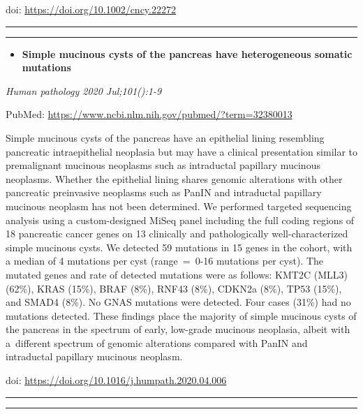 \documentclass[
]{article}
\providecommand{\tightlist}{%
  \setlength{\itemsep}{0pt}\setlength{\parskip}{0pt}}
\begin{document}
doi: \url{https://doi.org/10.1002/cncy.22272}

\begin{center}\rule{0.5\linewidth}{0.5pt}\end{center}

\begin{center}\rule{0.5\linewidth}{0.5pt}\end{center}

\begin{itemize}
\tightlist
\item
  \textbf{Simple mucinous cysts of the pancreas have heterogeneous
  somatic mutations}
\end{itemize}

\emph{Human pathology 2020 Jul;101():1-9}

PubMed: \url{https://www.ncbi.nlm.nih.gov/pubmed/?term=32380013}

Simple mucinous cysts of the pancreas have an epithelial lining
resembling pancreatic intraepithelial neoplasia but may have a clinical
presentation similar to premalignant mucinous neoplasms such as
intraductal papillary mucinous neoplasms. Whether the epithelial lining
shares genomic alterations with other pancreatic preinvasive neoplasms
such as PanIN and intraductal papillary mucinous neoplasm has not been
determined. We performed targeted sequencing analysis using a
custom-designed MiSeq panel including the full coding regions of 18
pancreatic cancer genes on 13 clinically and pathologically
well-characterized simple mucinous cysts. We detected 59 mutations in 15
genes in the cohort, with a median of 4 mutations per cyst (range~=~0-16
mutations per cyst). The mutated genes and rate of detected mutations
were as follows: KMT2C (MLL3) (62\%), KRAS (15\%), BRAF (8\%), RNF43
(8\%), CDKN2a (8\%), TP53 (15\%), and SMAD4 (8\%). No GNAS mutations
were detected. Four cases (31\%) had no mutations detected. These
findings place the majority of simple mucinous cysts of the pancreas in
the spectrum of early, low-grade mucinous neoplasia, albeit with
a~different spectrum of genomic alterations compared with PanIN and
intraductal papillary mucinous neoplasm.

doi: \url{https://doi.org/10.1016/j.humpath.2020.04.006}

\begin{center}\rule{0.5\linewidth}{0.5pt}\end{center}

\begin{center}\rule{0.5\linewidth}{0.5pt}\end{center}
\end{document}
